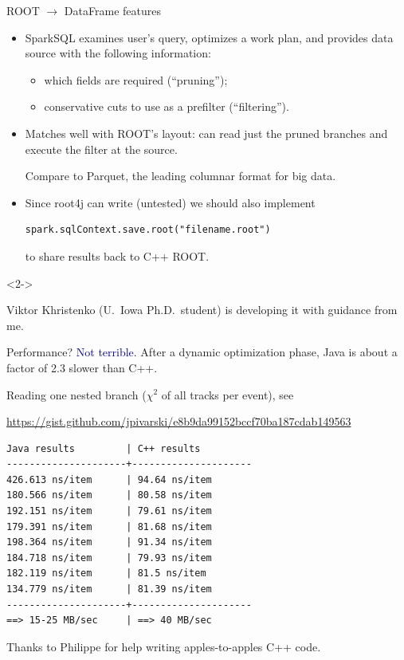 \documentclass{beamer}
\begin{document}
\begin{frame}[fragile]{ROOT $\to$ DataFrame features}
\vspace{0.5 cm}
\begin{itemize}\setlength{\itemsep}{0.25 cm}
\item SparkSQL examines user's query, optimizes a work plan, and provides data source with the following information:
\begin{itemize}
\item which fields are required (``pruning'');
\item conservative cuts to use as a prefilter (``filtering'').
\end{itemize}

\item Matches well with ROOT's layout: can read just the pruned branches and execute the filter at the source.

\vspace{0.25 cm}
Compare to Parquet, the leading columnar format for big data.

\item Since root4j can write (untested) we should also implement 
\begin{verbatim}
spark.sqlContext.save.root("filename.root")
\end{verbatim}
to share results back to C++ ROOT.
\end{itemize}

\begin{uncoverenv}<2->
\begin{center}
\Large Viktor Khristenko (U.\ Iowa Ph.D.\ student) is developing it with guidance from me.
\end{center}
\end{uncoverenv}
\end{frame}

\begin{frame}[fragile]{Performance?}
\vspace{0.5 cm}
{\Large \textcolor{darkblue}{Not terrible.} \normalsize After a dynamic optimization phase, Java is about a factor of 2.3 slower than C++.}

\vspace{0.25 cm}
\small
Reading one nested branch ($\chi^2$ of all tracks per event), see

\textcolor{blue}{\tiny \url{https://gist.github.com/jpivarski/e8b9da99152bccf70ba187cdab149563}}

\begin{verbatim}
Java results         | C++ results
---------------------+---------------------
426.613 ns/item      | 94.64 ns/item
180.566 ns/item      | 80.58 ns/item
192.151 ns/item      | 79.61 ns/item
179.391 ns/item      | 81.68 ns/item
198.364 ns/item      | 91.34 ns/item
184.718 ns/item      | 79.93 ns/item
182.119 ns/item      | 81.5 ns/item
134.779 ns/item      | 81.39 ns/item
---------------------+---------------------
==> 15-25 MB/sec     | ==> 40 MB/sec
\end{verbatim}

\normalsize
Thanks to Philippe for help writing apples-to-apples C++ code.
\end{frame}
\end{document}
